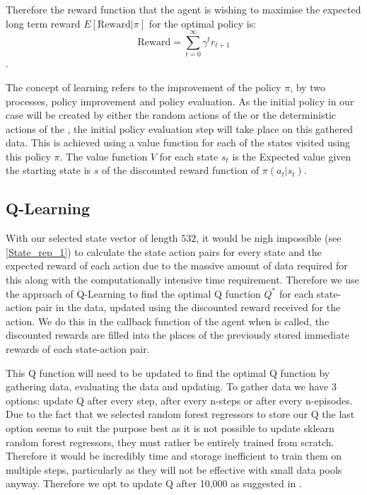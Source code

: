 Therefore the reward function that the agent is wishing to maximise the expected long term reward $E[\text{Reward}|\pi]$ for the optimal policy is: $$\text{Reward} = \sum_{t=0}^{\infty} \gamma^t r_{t+1}$$. 

The concept of learning refers to the improvement of the policy $\pi$, by two processes, policy improvement and policy evaluation. As the initial policy in our case will be created by either the random actions of the  or the deterministic actions of the , the initial policy evaluation step will take place on this gathered data.  This is achieved using a value function for each of the states visited using this policy $\pi$. The value function $V$ for each state $s_t$ is the Expected value given the starting state is $s$ of the discounted reward function of $\pi(a_t|s_t)$.

	\subsection{Q-Learning}
	With our selected state vector of length $532$, it would be nigh impossible (see \ref{State_rep_1}) to calculate the state action pairs for every state and the expected reward of each action due to the massive amount of data required for this along with the computationally intensive time requirement. Therefore we use the approach of Q-Learning to find the optimal Q function $Q^*$ for each state-action pair in the data, updated using the discounted reward received for the action. We do this in the callback function of the agent when  is called, the discounted rewards are filled into the places of the previously stored immediate rewards of each state-action pair. 
	
	This Q function will need to be updated to find the optimal Q function by gathering data, evaluating the data and updating. To gather data we have 3 options: update Q after every step, after every n-steps or after every n-episodes. Due to the fact that we selected random forest regressors to store our Q the last option seems to suit the purpose best as it is not possible to update sklearn random forest regressors, they must rather be entirely trained from scratch. Therefore it would be incredibly time and storage inefficient to train them on multiple steps, particularly as they will not be effective with small data pools anyway. Therefore we opt to update Q after 10,000 as suggested in \cite{paper}.
	
